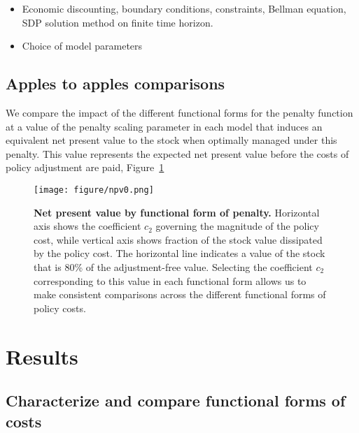 \documentclass[authoryear, review, 12pt]{elsarticle}
\begin{document}
\begin{itemize}
\item   Economic discounting, boundary conditions, constraints, Bellman equation, SDP solution method on finite time horizon.  
\item   Choice of model parameters 
\end{itemize}


\subsection{Apples to apples comparisons}

We compare the impact of the different functional forms for the penalty
function at a value of the penalty scaling parameter in each model that
induces an equivalent net present value to the stock when optimally
managed under this penalty. This value represents the expected net
present value before the costs of policy adjustment are paid, Figure~\ref{fig:apples}

  \begin{figure}
    \begin{center}
\texttt{[image: figure/npv0.png]}
\caption{\textbf{Net present value by functional form of penalty.} Horizontal axis shows the coefficient $c_2$ governing the magnitude of the policy cost, while vertical axis shows fraction of the stock value dissipated by the policy cost.  The horizontal line indicates a value of the stock that is 80\% of the adjustment-free value. Selecting the coefficient $c_2$ corresponding to this value in each functional form allows us to make consistent comparisons across the different functional forms of policy costs.  }
\label{fig:apples}
\end{center}
\end{figure}


\section{Results}
\subsection{Characterize and compare functional forms of costs}
\end{document}
